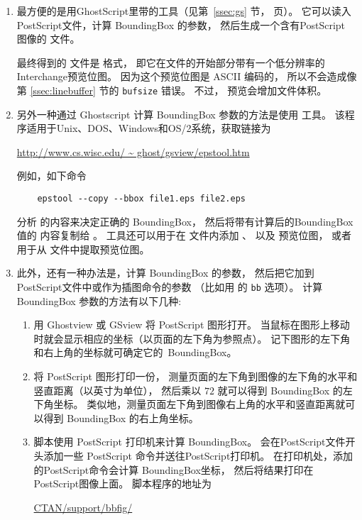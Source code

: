 \begin{enumerate}
	\item 最方便的是用GhostScript里带的工具（见第~\ref{ssec:gs} 节，\pageref{ssec:gs} 页）。
	它可以读入PostScript文件，计算 BoundingBox 的参数，
	然后生成一个含有PostScript 图像的 文件。
	
	最终得到的  文件是  格式，
	即它在文件的开始部分带有一个低分辨率的Interchange预览位图。
	因为这个预览位图是 \textsc{ASCII} 编码的，
	所以不会造成像第 \ref{ssec:linebuffer} 节的 \texttt{bufsize} 错误。
	不过， 预览会增加文件体积。
	\item 另外一种通过 Ghostscript 计算 BoundingBox 参数的方法是使用  工具。
	该程序适用于Unix、DOS、Windows和OS/2系统，获取链接为
	\begin{center}
		\url{http://www.cs.wisc.edu/ ~ ghost/gsview/epstool.htm}
	\end{center}
	例如，如下命令
\begin{verbatim}
    epstool --copy --bbox file1.eps file2.eps
\end{verbatim}
	分析  的内容来决定正确的 BoundingBox，
	然后将带有计算后的BoundingBox值的  内容复制给 。
	 工具还可以用于在  文件内添加 、 以及  预览位图，
	或者用于从  文件中提取预览位图。
	
	\item 此外，还有一种办法是，计算 BoundingBox 的参数，
	然后把它加到PostScript文件中或作为插图命令的参数
	（比如用  的 \texttt{bb} 选项）。
	计算BoundingBox 参数的方法有以下几种:	
	\begin{enumerate}
		\item 用 Ghostview 或 GSview 将 PostScript 图形打开。
		当鼠标在图形上移动时就会显示相应的坐标（以页面的左下角为参照点）。
		记下图形的左下角和右上角的坐标就可确定它的~BoundingBox。
		\item 将 PostScript 图形打印一份，
		测量页面的左下角到图像的左下角的水平和竖直距离（以英寸为单位），
		然后乘以 $72$ 就可以得到 BoundingBox 的左下角坐标。
		类似地，测量页面左下角到图像右上角的水平和竖直距离就可以得到 BoundingBox 的右上角坐标。
		\item {} 脚本使用 PostScript 打印机来计算 BoundingBox。
		 会在PostScript文件开头添加一些 PostScript 命令并送往PostScript打印机。
		在打印机处，添加的PostScript命令会计算 BoundingBox坐标，
		然后将结果打印在PostScript图像上面。
		 脚本程序的地址为
		\begin{center}
			\href{ftp://ctan.tug.org/tex-archive/support/bbfig/}{CTAN/support/bbfig/}
		\end{center}		
	\end{enumerate}
\end{enumerate}

